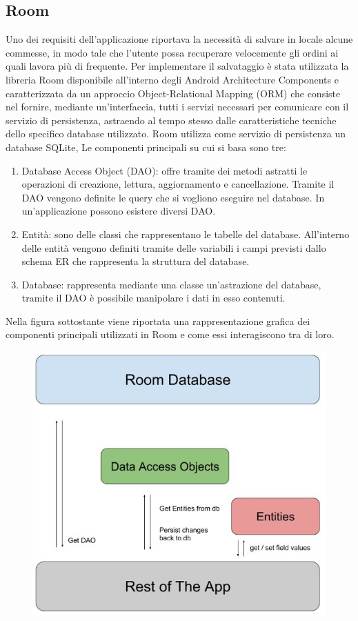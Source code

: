 \documentclass[12pt]{report}
\begin{document}
%
%
\subsection{Room}
Uno dei requisiti dell'applicazione riportava la necessità di salvare in locale alcune commesse, in modo tale che l'utente possa recuperare velocemente gli ordini ai quali lavora più di frequente. Per implementare il salvataggio è stata utilizzata la libreria Room\cite{Room} disponibile all'interno degli Android Architecture Components e caratterizzata da un approccio Object-Relational Mapping (ORM) che consiste nel fornire, mediante un'interfaccia, tutti i servizi necessari per comunicare con il servizio di persistenza, astraendo al tempo stesso dalle caratteristiche tecniche dello specifico database utilizzato. 
Room utilizza come servizio di persistenza un database SQLite, Le componenti principali su cui si basa sono tre:
\begin{enumerate}
	\item 
	 Database Access Object (DAO): offre tramite dei metodi astratti le operazioni di creazione, lettura, aggiornamento e cancellazione. Tramite il DAO vengono definite le query che si vogliono eseguire nel database. In un'applicazione possono esistere diversi DAO.
	\item Entità: sono delle classi che rappresentano le tabelle del database. All'interno delle entità vengono definiti tramite delle variabili i campi previsti dallo schema ER che rappresenta la struttura del database.
	\item Database: rappresenta mediante una classe un'astrazione del database, tramite il DAO è possibile manipolare i dati in esso contenuti.
\end{enumerate}
Nella figura sottostante viene riportata una rappresentazione grafica dei componenti principali utilizzati in Room e come essi interagiscono tra di loro.
\begin{figure}[!h]
	\centering
	\includegraphics[width=0.4\linewidth]{immagini/room}
	\caption{}
	\label{fig:room}
\end{figure}
\end{document}

